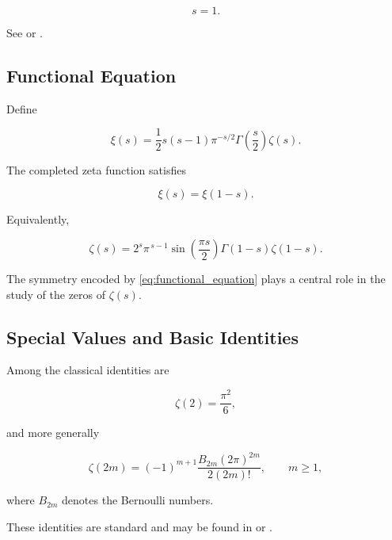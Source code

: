 \documentclass[11pt]{amsart}
\numberwithin{equation}{section}
\theoremstyle{plain}
\theoremstyle{definition}
\theoremstyle{remark}
\begin{document}
\begin{equation}
s=1.
\label{eq:zeta_pole}
\end{equation}

See
\cite{Edwards2001}
or
\cite{Titchmarsh1986}.

\subsection{Functional Equation}
\label{subsec:functional_equation}

Define

\begin{equation}
\xi(s)
=
\frac12
s(s-1)
\pi^{-s/2}
\Gamma\!\left(\frac{s}{2}\right)
\zeta(s).
\label{eq:xi_definition}
\end{equation}

The completed zeta function satisfies

\begin{equation}
\xi(s)
=
\xi(1-s).
\label{eq:functional_equation}
\end{equation}

Equivalently,

\begin{equation}
\zeta(s)
=
2^{s}
\pi^{\,s-1}
\sin\!\left(\frac{\pi s}{2}\right)
\Gamma(1-s)
\zeta(1-s).
\label{eq:functional_equation_zeta}
\end{equation}

The symmetry encoded by
\eqref{eq:functional_equation}
plays a central role in the study of the zeros of
$\zeta(s)$.

\subsection{Special Values and Basic Identities}
\label{subsec:special_values}

Among the classical identities are

\begin{equation}
\zeta(2)
=
\frac{\pi^{2}}{6},
\label{eq:zeta2}
\end{equation}

and more generally

\begin{equation}
\zeta(2m)
=
(-1)^{m+1}
\frac{B_{2m}(2\pi)^{2m}}
{2(2m)!},
\qquad
m\ge 1,
\label{eq:zeta_even_values}
\end{equation}

where
$B_{2m}$
denotes the Bernoulli numbers.

These identities are standard and may be found in
\cite{Titchmarsh1986}
or
\cite{Edwards2001}.
\end{document}
